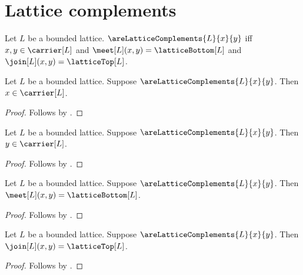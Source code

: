 \section{Lattice complements}



\begin{definition}\label{are_lattice_complements}
    Let $L$ be a bounded lattice.
    $\areLatticeComplements{L}{x}{y}$ iff
        $x,y\in\carrier[L]$ and
        $\meet[L](x,y)=\latticeBottom[L]$ and
        $\join[L](x,y)=\latticeTop[L]$.
\end{definition}

\begin{proposition}\label{are_lattice_complements_left_type}
    Let $L$ be a bounded lattice.
    Suppose $\areLatticeComplements{L}{x}{y}$.
    Then $x\in\carrier[L]$.
\end{proposition}
\begin{proof}
    Follows by .
\end{proof}

\begin{proposition}\label{are_lattice_complements_right_type}
    Let $L$ be a bounded lattice.
    Suppose $\areLatticeComplements{L}{x}{y}$.
    Then $y\in\carrier[L]$.
\end{proposition}
\begin{proof}
    Follows by .
\end{proof}

\begin{proposition}\label{are_lattice_complements_meet}
    Let $L$ be a bounded lattice.
    Suppose $\areLatticeComplements{L}{x}{y}$.
    Then $\meet[L](x,y)=\latticeBottom[L]$.
\end{proposition}
\begin{proof}
    Follows by .
\end{proof}

\begin{proposition}\label{are_lattice_complements_join}
    Let $L$ be a bounded lattice.
    Suppose $\areLatticeComplements{L}{x}{y}$.
    Then $\join[L](x,y)=\latticeTop[L]$.
\end{proposition}
\begin{proof}
    Follows by .
\end{proof}

